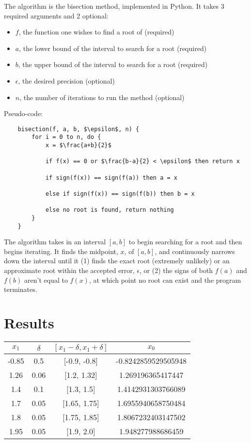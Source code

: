 \documentclass[12pt,letterpaper]{article}
\begin{document}
\begin{spacing}{1}
The algorithm is the bisection method, implemented in Python. It takes 3 required arguments and 2 optional: 
\begin{itemize}
    \item $f$, the function one wishes to find a root of (required)
    \item $a$, the lower bound of the interval to search for a root (required)
    \item $b$, the upper bound of the interval to search for a root (required)
    \item $\epsilon$, the desired precision (optional)
    \item $n$, the number of iterations to run the method (optional)
\end{itemize}
Pseudo-code:
\begin{lstlisting}
    bisection(f, a, b, $\epsilon$, n) {
        for i = 0 to n, do {
            x = $\frac{a+b}{2}$
            
            if f(x) == 0 or $\frac{b-a}{2} < \epsilon$ then return x
            
            if sign(f(x)) == sign(f(a)) then a = x
            
            else if sign(f(x)) == sign(f(b)) then b = x
            
            else no root is found, return nothing
        }
    }
\end{lstlisting}
The algorithm takes in an interval $[a, b]$ to begin searching for a root and then begins iterating. It finds the midpoint, $x$, of $[a, b]$, and continuously narrows down the interval until it (1) finds the exact root (extremely unlikely) or an approximate root within the accepted error, $\epsilon$, or (2) the signs of both $f(a)$ and $f(b)$ aren't equal to $f(x)$, at which point no root can exist and the program terminates.
 
\section{Results}
\begin{spacing}{1.2}
\begin{center}
 \begin{tabular}{||c c c c||} 
 \hline
 $x_1$ & $\delta$ & $[x_1 - \delta, x_1 + \delta]$ & $x_0$ \\ [0.5ex] 
 \hline\hline
 -0.85 & 0.5 & [-0.9, -0.8] & -0.8242859529505948 \\ 
 \hline
 1.26 & 0.06 & [1.2, 1.32] & 1.269196365417447 \\
 \hline
 1.4 & 0.1 & [1.3, 1.5] & 1.4142931303766089 \\
 \hline
 1.7 & 0.05 & [1.65, 1.75] & 1.6955940658750484 \\
 \hline
 1.8 & 0.05 & [1.75, 1.85] & 1.8067232403147502 \\
 \hline
 1.95 & 0.05 & [1.9, 2.0] & 1.948277988686459 \\
 \hline
\end{tabular}
\end{center}


\end{spacing}
\end{spacing}
\end{document}
